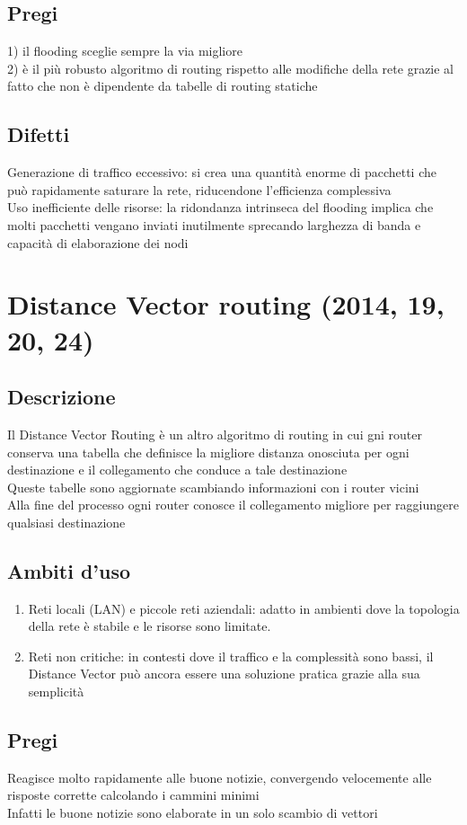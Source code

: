 \documentclass[10pt,oneside,a4paper]{article}
\begin{document}
\subsection{Pregi}
1) il flooding sceglie sempre la via migliore\\
2) è il più robusto algoritmo di routing rispetto alle modifiche della rete grazie al fatto che non è dipendente da tabelle di routing statiche
\subsection{Difetti}
Generazione di traffico eccessivo: si crea una quantità enorme di pacchetti che può rapidamente saturare la rete, riducendone l'efficienza complessiva \\
Uso inefficiente delle risorse: la ridondanza intrinseca del flooding implica che molti pacchetti vengano inviati inutilmente sprecando larghezza di banda e capacità di elaborazione dei nodi
\section{Distance Vector routing (2014, 19, 20, 24)}
\subsection{Descrizione}
Il Distance Vector Routing è un altro algoritmo di routing in cui gni router conserva una tabella che definisce la migliore distanza onosciuta per ogni destinazione e il collegamento che conduce a tale destinazione\\
Queste tabelle sono aggiornate scambiando informazioni con i router vicini\\
Alla fine del processo ogni router conosce il collegamento migliore per raggiungere qualsiasi destinazione
\subsection{Ambiti d'uso}
\begin{enumerate}
\item Reti locali (LAN) e piccole reti aziendali: adatto in ambienti dove la topologia della rete è stabile e le risorse sono limitate.
\item Reti non critiche: in contesti dove il traffico e la complessità sono bassi, il Distance Vector può ancora essere una soluzione pratica grazie alla sua semplicità
\end{enumerate}
\subsection{Pregi}
Reagisce molto rapidamente alle buone notizie, convergendo velocemente alle risposte corrette calcolando i cammini minimi\\
Infatti le buone notizie sono elaborate in un solo scambio di vettori 
\end{document}
